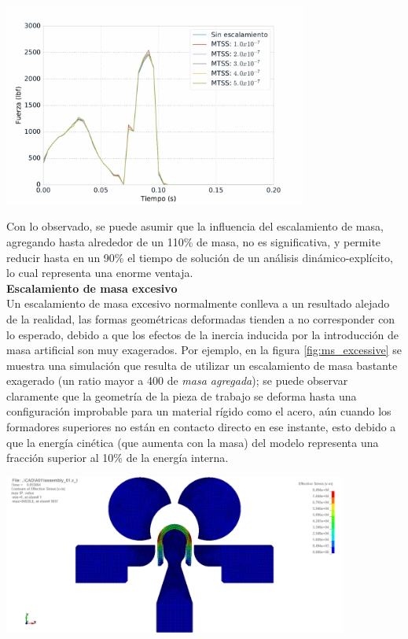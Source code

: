 \begin{center}
\includegraphics[width=0.75\textwidth]{src/ch4/ms_force.pdf}
\label{fig:ms_force}
\end{center}

Con lo observado, se puede asumir que la influencia del escalamiento de masa, agregando hasta alrededor 
de un 110\% de masa, no es significativa, y permite reducir hasta en un 90\% el tiempo de solución de 
un análisis dinámico-explícito, lo cual representa una enorme ventaja.\\

\textbf{Escalamiento de masa excesivo} \\

Un escalamiento de masa excesivo normalmente conlleva a un resultado alejado de la realidad, las formas 
geométricas deformadas tienden a no corresponder con lo esperado, debido a que los efectos de la inercia 
inducida por la introducción de masa artificial son muy exagerados. Por ejemplo, en la figura 
\ref{fig:ms_excessive} se muestra una simulación que resulta de utilizar un escalamiento de masa bastante 
exagerado (un ratio mayor a 400 de \textit{masa agregada}); se puede observar claramente que la geometría 
de la pieza de trabajo se deforma hasta una configuración improbable para un material rígido como el acero, 
aún cuando los formadores superiores no están en contacto directo en ese instante, esto debido a que la 
energía cinética (que aumenta con la masa) del modelo representa una fracción superior al 10\% de la 
energía interna.\\

\begin{center}
\includegraphics[width=0.85\textwidth]{src/ch4/ms_excessive.png}
\label{fig:ms_excessive}
\end{center}

